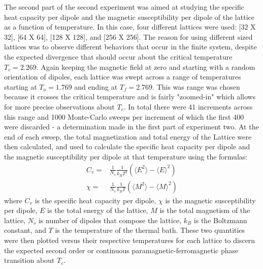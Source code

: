 \documentclass[twocolumn]{article}
\begin{document}
The second part of the second experiment was aimed at studying the specific heat capacity per dipole and the magnetic susceptibility per dipole of the lattice as a function of temperature. In this case, four different lattices were used: [32 X 32], [64 X 64], [128 X 128], and [256 X 256]. The reason for using different sized lattices was to observe different behaviors that occur in the finite system, despite the expected divergence that should occur about the critical temperature $T_c=2.269$. Again keeping the magnetic field at zero and starting with a random orientation of dipoles, each lattice was swept across a range of temperatures starting at $T_o=1.769$ and ending at $T_f=2.769$. This was range was chosen because it crosses the critical temperature and is fairly "zoomed-in" which allows for more precise observations about $T_c$. In total there were 41 increments across this range and 1000 Monte-Carlo sweeps per increment of which the first 400 were discarded - a determination made in the first part of experiment two. At the end of each sweep, the total magnetization and total energy of the Lattice were then calculated, and used to calculate the specific heat capacity per dipole and the magnetic susceptibility per dipole at that temperature using the formulas:
\begin{align}
C_v =& \frac{1}{N_s}\frac{1}{k_BT^{2}}\left( \langle E^{2}\rangle - \langle E \rangle^{2}\right) \\ 
\chi =& \frac{1}{N_s}\frac{1}{k_BT}\left( \langle M^{2}\rangle - \langle M \rangle^{2}\right)
\end{align}
where $C_v$ is the specific heat capacity per dipole, $\chi$ is the magnetic susceptibility per dipole, $E$ is the total energy of the lattice, $M$ is the total magnetism of the lattice, $N_s$ is number of dipoles that compose the lattice, $k_B$ is the Boltzmann constant, and $T$ is the temperature of the thermal bath. These two quantities were then plotted versus their respective temperatures for each lattice to discern the expected second order or continuous paramagnetic-ferromagnetic phase transition about $T_c$.
\end{document}

